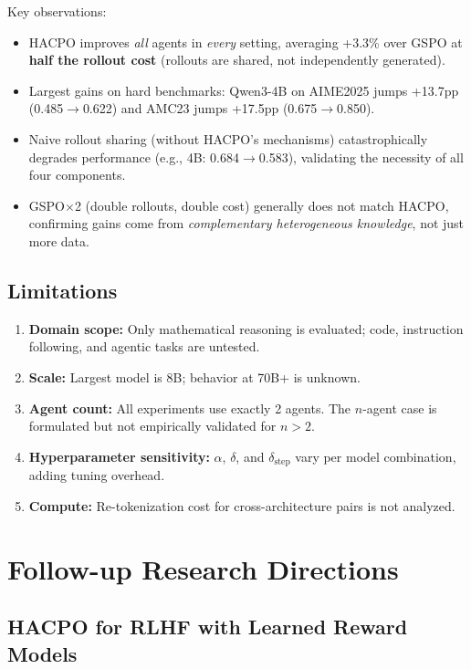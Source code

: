 \documentclass[11pt]{article}
\begin{document}
\noindent Key observations:
\begin{itemize}
    \item HACPO improves \emph{all} agents in \emph{every} setting, averaging +3.3\% over GSPO at \textbf{half the rollout cost} (rollouts are shared, not independently generated).
    \item Largest gains on hard benchmarks: Qwen3-4B on AIME2025 jumps +13.7pp (0.485$\to$0.622) and AMC23 jumps +17.5pp (0.675$\to$0.850).
    \item Naive rollout sharing (without HACPO's mechanisms) catastrophically degrades performance (e.g., 4B: 0.684$\to$0.583), validating the necessity of all four components.
    \item GSPO$\times$2 (double rollouts, double cost) generally does not match HACPO, confirming gains come from \emph{complementary heterogeneous knowledge}, not just more data.
\end{itemize}

\subsection{Limitations}

\begin{enumerate}
    \item \textbf{Domain scope:} Only mathematical reasoning is evaluated; code, instruction following, and agentic tasks are untested.
    \item \textbf{Scale:} Largest model is 8B; behavior at 70B+ is unknown.
    \item \textbf{Agent count:} All experiments use exactly 2 agents. The $n$-agent case is formulated but not empirically validated for $n > 2$.
    \item \textbf{Hyperparameter sensitivity:} $\alpha$, $\delta$, and $\delta_{\text{step}}$ vary per model combination, adding tuning overhead.
    \item \textbf{Compute:} Re-tokenization cost for cross-architecture pairs is not analyzed.
\end{enumerate}

\section{Follow-up Research Directions}

\subsection{HACPO for RLHF with Learned Reward Models}
\end{document}
